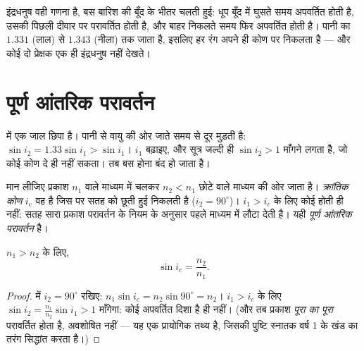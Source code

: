 \begin{remark}\label{rem:g10:refraction:rainbow}
इंद्रधनुष वही गणना है, बस बारिश की बूँद के भीतर चलती हुई: धूप बूँद में
घुसते समय अपवर्तित होती है, उसकी पिछली दीवार पर परावर्तित होती है, और
बाहर निकलते समय फिर अपवर्तित होती है। पानी का  $1.331$ (लाल)
से $1.343$ (नीला) तक जाता है, इसलिए हर रंग अपने ही कोण पर निकलता है
--- और कोई दो प्रेक्षक एक ही इंद्रधनुष नहीं देखते।
\end{remark}

\section{पूर्ण आंतरिक परावर्तन}

 में एक जाल छिपा है। पानी से वायु की ओर जाते समय
  से दूर मुड़ती है: $\sin i_2 = 1.33 \sin i_1 > \sin i_1$।
$i_1$ बढ़ाइए, और सूत्र जल्दी ही $\sin i_2 > 1$ माँगने लगता है, जो कोई कोण दे
ही नहीं सकता। तब  बस होना बंद हो जाता है।

\begin{definition}[क्रांतिक कोण और पूर्ण आंतरिक परावर्तन]\label{def:g10:refraction:critical}
मान लीजिए प्रकाश $n_1$  वाले माध्यम में चलकर $n_2 < n_1$ छोटे
 वाले माध्यम की ओर जाता है। \emph{क्रांतिक
कोण} $i_c$ वह  है जिस पर
 सतह को छूती हुई निकलती है ($i_2 = 90^\circ$)। $i_1 > i_c$ के
लिए कोई  होती ही नहीं: सतह सारा प्रकाश परावर्तन
के नियम के अनुसार पहले माध्यम में लौटा देती है। यही \emph{पूर्ण आंतरिक
परावर्तन} है।
\end{definition}

\begin{proposition}[क्रांतिक कोण का सूत्र]\label{prop:g10:refraction:criticalformula}
$n_1 > n_2$ के लिए,
\[
\sin i_c = \frac{n_2}{n_1} .
\]
\end{proposition}

\begin{proof}
 में $i_2 = 90^\circ$ रखिए: $n_1 \sin i_c = n_2 \sin 90^\circ
= n_2$। $i_1 > i_c$ के लिए
 $\sin i_2 = \frac{n_1}{n_2}\sin i_1 > 1$ माँगेगा: कोई अपवर्तित दिशा है ही नहीं।
(और तब प्रकाश \emph{पूरा का पूरा} परावर्तित होता है, अवशोषित नहीं ---
यह एक प्रायोगिक तथ्य है, जिसकी पुष्टि स्नातक वर्ष 1 के खंड का तरंग
सिद्धांत करता है।)
\end{proof}

